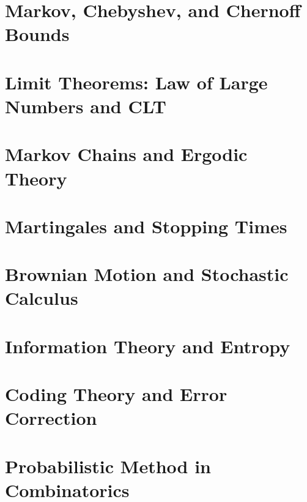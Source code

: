 \chapter{Markov, Chebyshev, and Chernoff Bounds}
\chapter{Limit Theorems: Law of Large Numbers and CLT}
\chapter{Markov Chains and Ergodic Theory}
\chapter{Martingales and Stopping Times}
\chapter{Brownian Motion and Stochastic Calculus}
\chapter{Information Theory and Entropy}
\chapter{Coding Theory and Error Correction}
\chapter{Probabilistic Method in Combinatorics}